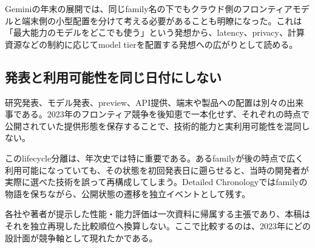 Geminiの年末の展開では、同じfamily名の下でもクラウド側のフロンティアモデルと端末側の小型配置を分けて考える必要があることも明瞭になった。これは「最大能力のモデルをどこでも使う」という発想から、latency、privacy、計算資源などの制約に応じてmodel tierを配置する発想への広がりとして読める。\autocite{src-93d355bf8806,src-a3dead6cff65,src-db671ee1d1b8,src-e116708067ab,src-fd9cb9c0061f}


\subsection{発表と利用可能性を同じ日付にしない}

研究発表、モデル発表、preview、API提供、端末や製品への配置は別々の出来事である。2023年のフロンティア競争を後知恵で一本化せず、それぞれの時点で公開されていた提供形態を保存することで、技術的能力と実利用可能性を混同しない。\autocite{src-013fa77665db,src-3375c5d27d9b,src-39071a9443e5,src-5bfa9c93d034,src-93d355bf8806,src-a3dead6cff65,src-a95452783369,src-b1525886b462,src-db671ee1d1b8,src-e116708067ab,src-f5041642fb21,src-f951bda6a0f4,src-fd9cb9c0061f}


このlifecycle分離は、年次史では特に重要である。あるfamilyが後の時点で広く利用可能になっていても、その状態を初回発表日に遡らせると、当時の開発者が実際に選べた技術を誤って再構成してしまう。Detailed Chronologyではfamilyの物語を保ちながら、公開状態の遷移を独立イベントとして残す。\autocite{src-013fa77665db,src-3375c5d27d9b,src-39071a9443e5,src-5bfa9c93d034,src-93d355bf8806,src-a3dead6cff65,src-a95452783369,src-b1525886b462,src-db671ee1d1b8,src-f5041642fb21,src-f951bda6a0f4,src-fd9cb9c0061f}


\begin{claimboundary}
各社や著者が提示した性能・能力評価は一次資料に帰属する主張であり、本稿はそれを独立再現した比較順位へ換算しない。ここで比較するのは、2023年にどの設計面が競争軸として現れたかである。\autocite{src-3375c5d27d9b,src-5bfa9c93d034,src-a95452783369,src-f951bda6a0f4}
\end{claimboundary}
